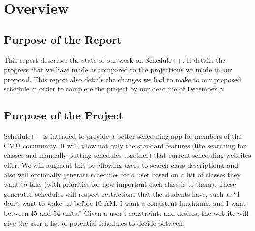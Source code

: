 \section{Overview}
\subsection{Purpose of the Report}
  This report describes the state of our work on Schedule++. It details the
  progress that we have made as compared to the projections we made in our
  proposal. This report also details the changes we had to make to our proposed
  schedule in order to complete the project by our deadline of December 8.

\subsection{Purpose of the Project}
  Schedule++ is intended to provide a better scheduling app for members of the
  CMU community. It will allow not only the standard features (like searching
  for classes and manually putting schedules together) that current scheduling
  websites offer. We will augment this by allowing users to search class
  descriptions, and also will optionally generate schedules for a user based
  on a list of classes they want to take (with priorities for how important
  each class is to them). These generated schedules will respect restrictions
  that the students have, such as ``I don't want to wake up before 10 AM, I want
  a consistent lunchtime, and I want between 45 and 54 units.''
  Given a user's constraints and desires, the website will give the user a list
  of potential schedules to decide between.

